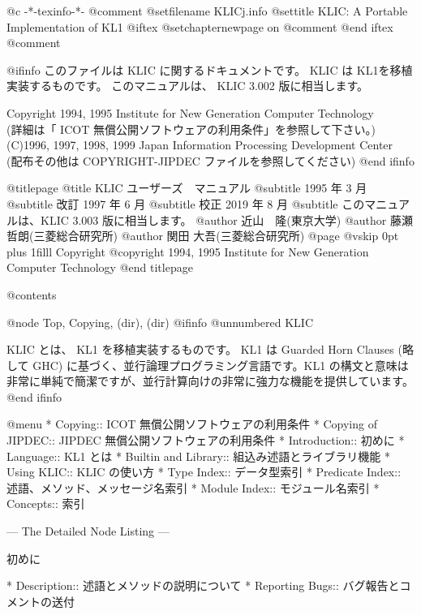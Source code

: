   @c -*-texinfo-*-
@comment %
@setfilename KLICj.info
@settitle KLIC: A Portable Implementation of KL1
@iftex
@setchapternewpage on
@comment %
@end iftex
@comment %

@ifinfo
このファイルは KLIC に関するドキュメントです。
KLIC は KL1を移植実装するものです。
このマニュアルは、 KLIC 3.002 版に相当します。

Copyright 1994, 1995 Institute for New Generation Computer Technology\\
(詳細は「 ICOT 無償公開ソフトウェアの利用条件」を参照して下さい。)\\
(C)1996, 1997, 1998, 1999 Japan Information Processing Development Center\\
(配布その他は COPYRIGHT-JIPDEC ファイルを参照してください)
@end ifinfo

@titlepage
@title KLIC ユーザーズ　マニュアル
@subtitle 1995 年 3 月
@subtitle 改訂 1997 年 6 月
@subtitle 校正 2019 年 8 月
@subtitle このマニュアルは、KLIC 3.003 版に相当します。
@author 近山　隆(東京大学)
@author 藤瀬 哲朗(三菱総合研究所)
@author 関田 大吾(三菱総合研究所)
@page
@vskip 0pt plus 1filll
Copyright @copyright{} 1994, 1995 Institute for New Generation Computer Technology
@end titlepage

@contents

@node Top, Copying, (dir), (dir)
@ifinfo
@unnumbered KLIC

KLIC とは、 KL1 を移植実装するものです。 KL1 は Guarded Horn Clauses 
(略して GHC) に基づく、並行論理プログラミング言語です。KL1 の構文と意味は
非常に単純で簡潔ですが、並行計算向けの非常に強力な機能を提供しています。
@end ifinfo

@menu
* Copying::                     ICOT 無償公開ソフトウェアの利用条件
* Copying of JIPDEC::           JIPDEC 無償公開ソフトウェアの利用条件
* Introduction::                初めに
* Language::                    KL1 とは
* Builtin and Library::         組込み述語とライブラリ機能
* Using KLIC::                  KLIC の使い方
* Type Index::                  データ型索引
* Predicate Index::             述語、メソッド、メッセージ名索引
* Module Index::                モジュール名索引
* Concepts::                    索引

 --- The Detailed Node Listing ---

初めに

* Description::                 述語とメソッドの説明について
* Reporting Bugs::              バグ報告とコメントの送付

